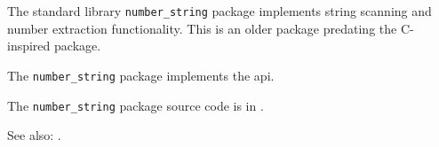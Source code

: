 
The standard library {\tt number\_string} package implements string scanning 
and number extraction functionality.  This is an older package predating the C-inspired  
 package.

The {\tt number\_string} package implements the  api.

The {\tt number\_string} package source code is in .

See also:   .


